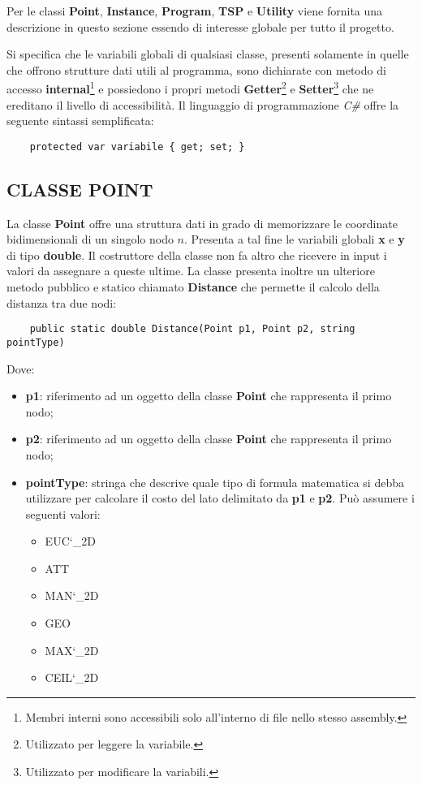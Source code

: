 \documentclass[11pt]{article}
\begin{document}
Per le classi \textbf{Point}, \textbf{Instance}, \textbf{Program}, \textbf{TSP} e \textbf{Utility} viene fornita una descrizione in questo sezione essendo di interesse globale per tutto il progetto.

Si specifica che le variabili globali di qualsiasi classe, presenti solamente in quelle che offrono strutture dati utili al programma, sono dichiarate con metodo di accesso \textbf{internal}\footnote{Membri interni sono accessibili solo all'interno di file nello stesso assembly.} e possiedono i propri metodi \textbf{Getter}\footnote{Utilizzato per leggere la variabile.} e \textbf{Setter}\footnote{Utilizzato per modificare la variabili.} che ne ereditano il livello di accessibilità. Il linguaggio di programmazione \textit{C\#} offre la seguente sintassi semplificata:

\begin{lstlisting}
    protected var variabile { get; set; }
\end{lstlisting}

\subsection*{CLASSE POINT}
\label{sec:ClassePointS}

La classe \textbf{Point} offre una struttura dati in grado di memorizzare le coordinate bidimensionali di un singolo nodo $n$.
Presenta a tal fine le variabili globali \textbf{x} e \textbf{y} di tipo \textbf{double}. Il costruttore della classe non fa altro che ricevere in input i valori da assegnare a queste ultime. La classe presenta inoltre un ulteriore metodo pubblico e statico chiamato \textbf{Distance} che permette il calcolo della distanza tra due nodi:

\begin{lstlisting}
    public static double Distance(Point p1, Point p2, string pointType)
\end{lstlisting}

Dove:

\begin{itemize}
\item \textbf{p1}: riferimento ad un oggetto della classe \textbf{Point} che rappresenta il primo nodo;
\item \textbf{p2}: riferimento ad un oggetto della classe \textbf{Point} che rappresenta il primo nodo;
\item \textbf{pointType}: stringa che descrive quale tipo di formula matematica si debba utilizzare per calcolare il costo del lato delimitato da \textbf{p1} e \textbf{p2}. Può assumere i seguenti valori:
    \begin{itemize}
    \item EUC\char`\_2D
    \item ATT
    \item MAN\char`\_2D
    \item GEO
    \item MAX\char`\_2D
    \item CEIL\char`\_2D
    \end{itemize}
\end{itemize}
\end{document}
